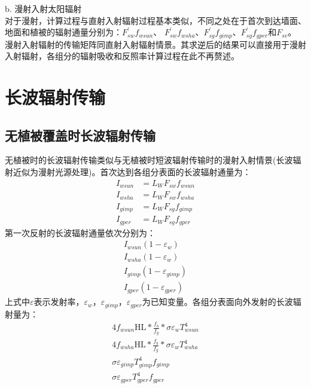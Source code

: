 b. 漫射入射太阳辐射\\
对于漫射，计算过程与直射入射辐射过程基本类似，不同之处在于首次到达墙面、地面和植被的辐射通量分别为：$F_{sw}^\prime f_{wsun}$、
$F_{sw}^\prime f_{wsha}$、$F_{sg}^\prime f_{gimp}$、$F_{sg}^\prime f_{gper}$和$F_{sv}$。
漫射入射辐射的传输矩阵同直射入射辐射情景。其求逆后的结果可以直接用于漫射入射辐射，各组分的辐射吸收和反照率计算过程在此不再赘述。 
\section{长波辐射传输}
\subsection{无植被覆盖时长波辐射传输}
无植被时的长波辐射传输类似与无植被时短波辐射传输时的漫射入射情景(长波辐射近似为漫射光源处理)。首次达到各组分表面的长波辐射通量为：
\begin{equation}
\begin{aligned} I_{wsun} &=L_{W} F_{s w} f_{wsun} \\ I_{wsha} &=L_{W} F_{s w} f_{wsha} \\ I_{gimp} &=L_{W} F_{s g} f_{gimp} \\ I_{gper} &=L_{W} F_{s g} f_{gper} \end{aligned}
\end{equation}
第一次反射的长波辐射通量依次分别为：
\begin{equation}
\begin{array}{c}I_{wsun}\left(1-\varepsilon_{w}\right) \\ I_{wsha}\left(1-\varepsilon_{w}\right) \\ I_{gimp}\left(1-\varepsilon_{gimp}\right) \\ I_{gper}\left(1-\varepsilon_{gper}\right)\end{array}
\end{equation}
上式中$\varepsilon$表示发射率，$\varepsilon_w$，$\varepsilon_{gimp}$，$\varepsilon_{gper}$为已知变量。各组分表面向外发射的长波辐射量为：
\begin{equation}
\begin{array}{c}4 f_{wsun} \mathrm{HL} * \frac{f_{b}}{f_{g}} * \sigma \varepsilon_{w} T_{wsun}^{4} \\ 4 f_{wsha} \mathrm{HL} * \frac{f_{b}}{f_{g}} * \sigma \varepsilon_{w} T_{wsha}^{4} \\ \sigma \varepsilon_{gimp} T_{gimp}^{4} f_{gimp} \\ \sigma \varepsilon_{gper} T_{gper}^{4} f_{gper}\end{array}
\end{equation}
